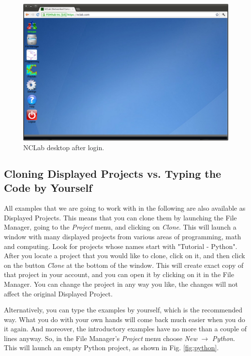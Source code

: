 \documentclass[article,A4,12pt]{llncs}
\begin{document}
\begin{figure}[!ht]
\begin{center}
\includegraphics[width=\textwidth]{img/desktop.png}
\end{center}
\vspace{-2mm}
\caption{NCLab desktop after login.}
\label{fig:desktop}
\end{figure}
\newpage

\subsection*{Cloning Displayed Projects vs. Typing the Code by Yourself}

All examples that we are going to work with in the following are also available 
as Displayed Projects. This means that you can clone them by launching the File
Manager, going to the {\em Project} menu, and clicking on {\em Clone}. This will launch 
a window with many displayed projects from various areas of programming,
math and computing. Look for projects whose names start with "Tutorial - Python".
After you locate a project that you would like to clone, click on it,
and then click on the button {\em Clone} at the bottom of the window. This will
create exact copy of that project in your account, and you can open it 
by clicking on it in the File Manager. You can change the project in any way 
you like, the changes will not affect the original Displayed Project. 

Alternatively, you can type the examples by yourself, which is the 
recommended way. What you do with your own hands will come back much easier 
when you do it again. And moreover, the introductory examples have no more than 
a couple of lines anyway. So, in the File Manager's {\em Project} menu 
choose {\em New} $\rightarrow$ {\em Python}. This will launch an 
empty Python project, as shown in Fig. \ref{fig:python}.\\[-7mm]
\end{document}
